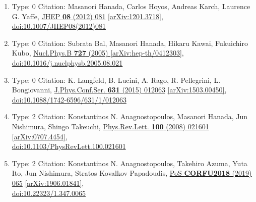 \documentclass[a4paper,10pt]{article}
\begin{document}
\begin{enumerate}
\begin{enumerate}
  \item Type: 0 Citation: Masanori Hanada, Carlos Hoyos, Andreas Karch, Laurence G. Yaffe, \href{https://www.doi.org/10.1007/JHEP08(2012)081}{JHEP {\bf 08} (2012) 081}  \href{https://arxiv.org/abs/1201.3718}{[arXiv:1201.3718]},\\\href{https://www.doi.org/10.1007/JHEP08(2012)081}{doi:10.1007/JHEP08(2012)081}
  \item Type: 0 Citation: Subrata Bal, Masanori Hanada, Hikaru Kawai, Fukuichiro Kubo, \href{https://www.doi.org/10.1016/j.nuclphysb.2005.08.021}{Nucl.Phys.B {\bf 727} (2005) }  \href{https://arxiv.org/abs/hep-th/0412303}{[arXiv:hep-th/0412303]},\\\href{https://www.doi.org/10.1016/j.nuclphysb.2005.08.021}{doi:10.1016/j.nuclphysb.2005.08.021}
  \item Type: 0 Citation: K. Langfeld, B. Lucini, A. Rago, R. Pellegrini, L. Bongiovanni, \href{https://www.doi.org/10.1088/1742-6596/631/1/012063}{J.Phys.Conf.Ser. {\bf 631} (2015) 012063}  \href{https://arxiv.org/abs/1503.00450}{[arXiv:1503.00450]},\\\href{https://www.doi.org/10.1088/1742-6596/631/1/012063}{doi:10.1088/1742-6596/631/1/012063}
  \item Type: 2 Citation: Konstantinos N. Anagnostopoulos, Masanori Hanada, Jun Nishimura, Shingo Takeuchi, \href{https://www.doi.org/10.1103/PhysRevLett.100.021601}{Phys.Rev.Lett. {\bf 100} (2008) 021601}  \href{https://arxiv.org/abs/0707.4454}{[arXiv:0707.4454]},\\\href{https://www.doi.org/10.1103/PhysRevLett.100.021601}{doi:10.1103/PhysRevLett.100.021601}
  \item Type: 2 Citation: Konstantinos N. Anagnostopoulos, Takehiro Azuma, Yuta Ito, Jun Nishimura, Stratos Kovalkov Papadoudis, \href{https://www.doi.org/10.22323/1.347.0065}{PoS {\bf CORFU2018} (2019) 065}  \href{https://arxiv.org/abs/1906.01841}{[arXiv:1906.01841]},\\\href{https://www.doi.org/10.22323/1.347.0065}{doi:10.22323/1.347.0065}

\end{enumerate}
\end{enumerate}
\end{document}
